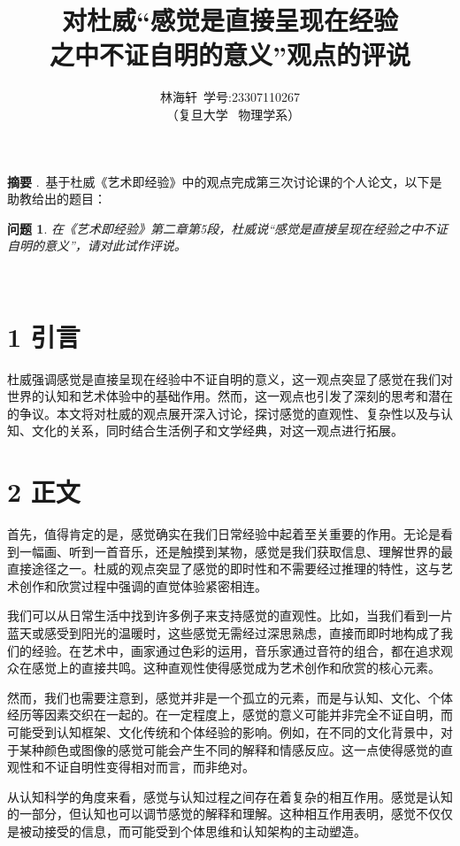 \documentclass[twocolumn]{ctexart}
\title{对杜威“感觉是直接呈现在经验\\之中不证自明的意义”观点的评说}
\author{ 林海轩\ 学号:23307110267 \\\ （复旦大学 \ 物理学系）}
\date{\vspace{-2em}}
\begin{document}
	
	\maketitle
	
	\begin{strip}
		
		\noindent  \textbf{摘要} .\ 基于杜威《艺术即经验》中的观点完成第三次讨论课的个人论文，以下是助教给出的题目：
		\newtheorem*{lemma}{问题}
		\begin{lemma}在《艺术即经验》第二章第5段，杜威说“感觉是直接呈现在经验之中不证自明的意义”，请对此试作评说。
		\end{lemma}
		
		\leavevmode\\
	\end{strip}
	
	\section*{1  引言}
	杜威强调感觉是直接呈现在经验中不证自明的意义，这一观点突显了感觉在我们对世界的认知和艺术体验中的基础作用。然而，这一观点也引发了深刻的思考和潜在的争议。本文将对杜威的观点展开深入讨论，探讨感觉的直观性、复杂性以及与认知、文化的关系，同时结合生活例子和文学经典，对这一观点进行拓展。
	
	\section*{2  正文}
	
	首先，值得肯定的是，感觉确实在我们日常经验中起着至关重要的作用。无论是看到一幅画、听到一首音乐，还是触摸到某物，感觉是我们获取信息、理解世界的最直接途径之一。杜威的观点突显了感觉的即时性和不需要经过推理的特性，这与艺术创作和欣赏过程中强调的直觉体验紧密相连。
	
	我们可以从日常生活中找到许多例子来支持感觉的直观性。比如，当我们看到一片蓝天或感受到阳光的温暖时，这些感觉无需经过深思熟虑，直接而即时地构成了我们的经验。在艺术中，画家通过色彩的运用，音乐家通过音符的组合，都在追求观众在感觉上的直接共鸣。这种直观性使得感觉成为艺术创作和欣赏的核心元素。
	
	然而，我们也需要注意到，感觉并非是一个孤立的元素，而是与认知、文化、个体经历等因素交织在一起的。在一定程度上，感觉的意义可能并非完全不证自明，而可能受到认知框架、文化传统和个体经验的影响。例如，在不同的文化背景中，对于某种颜色或图像的感觉可能会产生不同的解释和情感反应。这一点使得感觉的直观性和不证自明性变得相对而言，而非绝对。
	
	从认知科学的角度来看，感觉与认知过程之间存在着复杂的相互作用。感觉是认知的一部分，但认知也可以调节感觉的解释和理解。这种相互作用表明，感觉不仅仅是被动接受的信息，而可能受到个体思维和认知架构的主动塑造。
	
\end{document}
